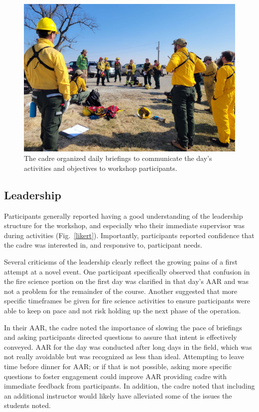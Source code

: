 \documentclass[fire,article,submit,moreauthors,pdftex]{Definitions/mdpi}
\begin{document}
\begin{figure}
\centering
\includegraphics[width=1\columnwidth]{BriefingCircle.jpg}
\caption{The cadre organized daily briefings to communicate the day's activities and objectives to workshop participants. }\label{briefing}
\end{figure}


\subsection{Leadership}

Participants generally reported having a good understanding of the leadership structure for the workshop, and especially who their immediate supervisor was during activities (Fig.~\ref{likert}).
Importantly, participants reported confidence that the cadre was interested in, and responsive to, participant needs.

Several criticisms of the leadership clearly reflect the growing pains of a first attempt at a novel event.
One participant specifically observed that confusion in the fire science portion on the first day was clarified in that day's AAR and was not a problem for the remainder of the course.
Another suggested that more specific timeframes be given for fire science activities to ensure participants were able to keep on pace and not risk holding up the next phase of the operation.

In their AAR, the cadre noted the importance of slowing the pace of briefings and asking participants directed questions to assure that intent is effectively conveyed.
AAR for the day was conducted after long days in the field, which was not really avoidable but was recognized as less than ideal.
Attempting to leave time before dinner for AAR; or if that is not possible, asking more specific questions to foster engagement could improve AAR providing cadre with immediate feedback from participants.
In addition, the cadre noted that including an additional instructor would likely have alleviated some of the issues the students noted.
\end{document}
